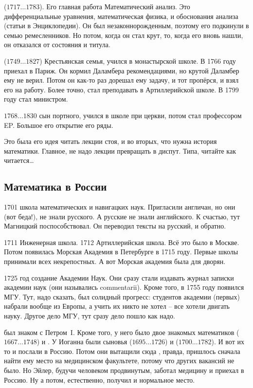 \documentclass[a4paper,oneside,fleqn,10pt]{article}
\newcommand{\pe}[2]{${#1}\ldots{#2}$}
\begin{document}
 (\pe{1717}{1783}). Его главная работа Математический
анализ.  Это дифференциальные уравнения, математическая физика, и
обоснования анализа (статьи в Энциклопедии).  Он был
незаконнорожденным, поэтому его подкинули в семью ремесленников.  Но
потом, когда он стал крут, то, когда его вновь нашли, он отказался от
состояния и титула.

 (\pe{1749}{1827}) Крестьянская семья, учился в
монастырской школе.  В 1766 году приехал в Париж. Он кормил Даламбера
рекомендациями, но крутой Даламбер ему не верил. Потом он как-то раз
дорешал ему задачу, и тот пропёрся, и взял его на работу.  Более
точно, стал преподавать в Артиллерийской школе. В 1799 году стал
министром.

 \pe{1768}{1830} сын портного, учился в школе при церкви,
потом стал профессором EP.  Большое его открытие его ряды.

Это была его идея читать лекции стоя, и во вторых, что нужна история
математики.  Главное, не надо лекции превращать в диспут. Типа,
читайте как читается\ldots

\subsection{Математика в России}

1701 школа математических и навигацких наук.  Пригласили англичан, но
они (вот беда!), не знали русского. А русские не знали английского. К
счастью, тут Магницкий поспособствовал. Он переводил тексты на
русский, и обратно.

1711 Инженерная школа. 1712 Артиллерийская школа. Всё это было в
Москве.  Потом появилась Морская Академия в Петербурге в 1715
году. Первые школы принимали всех некрепостных. А вот Морская академия
была для дворян.

1725 год создание Академии Наук. Они сразу стали издавать журнал
записки академии наук (они назывались commentarii). Кроме того, в 1755
году появился МГУ. Тут, надо сказать, был солидный прогресс: студентов
академии (первых) набрали вообще из Европы, а учить их никто не хотел
-- все хотели двигать науку.  Другое дело МГУ, тут сразу дело пошло как
надо.

 был знаком с Петром~I. Кроме того, у него было двое
знакомых математиков 
(\pe{1667}{1748}) и .  У Иоганна
были сыновья  (\pe{1695}{1726}) и
 (\pe{1700}{1782}). И вот их то и
послали в Россию.  Потом они вытащили сюда ,
правда, пришлось сначала найти ему место на медицинском факультете,
потому что других вакансий не было. Но Эйлер, будучи человеком
продвинутым, заботал медицину и приехал в Россию. Ну а потом,
естественно, получил и нормальное место.
\end{document}
